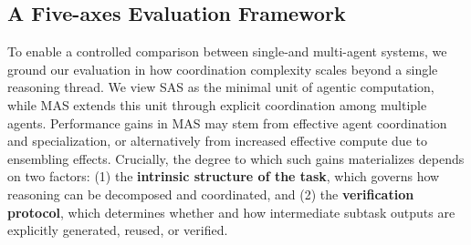 


\subsection{A Five-axes Evaluation Framework}
\label{sec:five_axis_framework}

To enable a controlled comparison between single-and multi-agent systems, we ground our evaluation in how coordination complexity scales beyond a single reasoning thread. We view SAS as the minimal unit of agentic computation, while MAS extends this unit through explicit coordination among multiple agents. Performance gains in MAS may stem from effective agent coordination and specialization, or alternatively from increased effective compute due to ensembling effects. Crucially, the degree to which such gains materializes depends on two factors: (1) the \textbf{intrinsic structure of the task}, which governs how reasoning can be decomposed and coordinated, and (2) the \textbf{verification protocol}, which determines whether and how intermediate subtask outputs are explicitly generated, reused, or verified.


